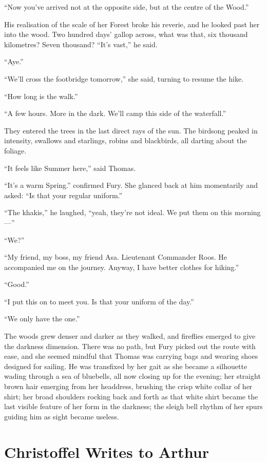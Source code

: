 \documentclass[11pt,a5paper]{article}
\begin{document}
``Now you've arrived not at the opposite side, but at the centre of the Wood.''

His realisation of the scale of her Forest broke his reverie, and he looked past her into the wood. Two hundred days' gallop across, what was that, six thousand kilometres? Seven thousand? ``It's vast,'' he said.

``Aye.''

``We'll cross the footbridge tomorrow,'' she said, turning to resume the hike.

``How long is the walk.''

``A few hours. More in the dark. We'll camp this side of the waterfall.''

They entered the trees in the last direct rays of the sun. The birdsong peaked in intensity, swallows and starlings, robins and blackbirds, all darting about the foliage.

``It feels like Summer here,'' said Thomas.

``It's a warm Spring.'' confirmed Fury. She glanced back at him momentarily and asked: ``Is that your regular uniform.''

``The khakis,'' he laughed, ``yeah, they're not ideal. We put them on this morning---''

``We?''

``My friend, my boss, my friend Asa. Lieutenant Commander Roos. He accompanied me on the journey. Anyway, I have better clothes for hiking.''

``Good.''

``I put this on to meet you. Is that your uniform of the day.''

``We only have the one.''

The woods grew denser and darker as they walked, and fireflies emerged to give the darkness dimension. There was no path, but Fury picked out the route with ease, and she seemed mindful that Thomas was carrying bags and wearing shoes designed for sailing. He was transfixed by her gait as she became a silhouette wading through a sea of bluebells, all now closing up for the evening; her straight brown hair emerging from her headdress, brushing the crisp white collar of her shirt; her broad shoulders rocking back and forth as that white shirt became the last visible feature of her form in the darkness; the sleigh bell rhythm of her spurs guiding him as sight became useless.

\newpage

\section{Christoffel Writes to Arthur}
\end{document}
